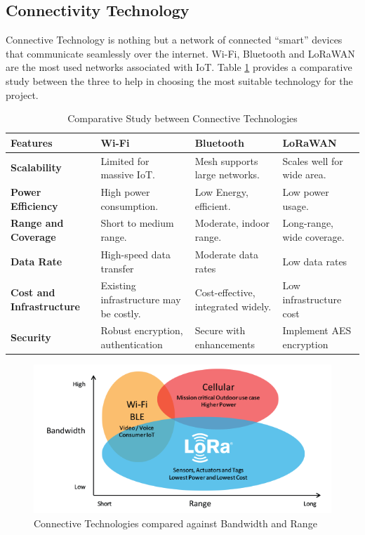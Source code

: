 \subsection{Connectivity Technology}
Connective Technology is nothing but a network of connected “smart” devices that communicate seamlessly over the internet. Wi-Fi, Bluetooth and LoRaWAN are the most used networks associated with IoT. Table \ref{table:connective-technology} provides a comparative study between the three to help in choosing the most suitable technology for the project.\\
\begin{table}[h]
    \centering
    \begin{tabularx}{\textwidth}{|X|X|X|X|}
        \hline
        \textbf{Features} & \textbf{Wi-Fi} & \textbf{Bluetooth} & \textbf{LoRaWAN} \\ \hline
        \textbf{Scalability} & Limited for massive IoT. & Mesh supports large networks. & Scales well for wide area. \\ \hline
        \textbf{Power Efficiency} &  High power consumption.& Low Energy, efficient. & Low power usage. \\ \hline
        \textbf{Range and Coverage} & Short to medium range.&Moderate, indoor range.&Long-range, wide coverage. \\ \hline
        \textbf{Data Rate} & High-speed data transfer & Moderate data rates & Low data rates \\ \hline
        \textbf{Cost and Infrastructure} & Existing infrastructure may be costly. & Cost-effective, integrated widely. & Low infrastructure cost\\ \hline
        \textbf{Security} & Robust encryption, authentication & Secure with enhancements& Implement AES encryption \\ \hline
    \end{tabularx}
    \caption{Comparative Study between Connective Technologies}
    \label{table:connective-technology}
\end{table}

\begin{figure}
        \centering
        \includegraphics[width=\linewidth]{images/connective-technology.png}
        \caption{Connective Technologies compared against Bandwidth and Range \cite{ref29}}
        \label{fig:connective-technology}
    \end{figure}

